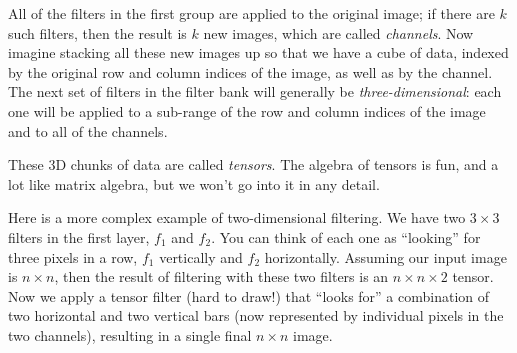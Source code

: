 All of the filters in the first group are applied to the original
image;  if there are $k$ such filters, then the result is $k$ new
images,   which are called {\em channels}.  Now imagine stacking all
these new images up so that we have a cube of data, indexed by the
original row and column indices  of the image,  as well as by the
channel.  The next set of filters in the filter bank will generally be
  {\em three-dimensional}:  each one will be applied to a sub-range of the
row and column indices of the image and to all of the channels.

These 3D chunks of data are called {\em tensors}.
The algebra of tensors is fun, and a lot like matrix algebra,  but we
won't go into it in any detail.

Here is a more complex example of two-dimensional filtering.  We have
two $3 \times 3$ filters in the first layer, $f_1$  and $f_2$.  You
can think of each one as ``looking'' for three pixels in a row, $f_1$
vertically and $f_2$ horizontally.  Assuming our input  image is $n
  \times n$, then the result of filtering with these two filters is an $n
  \times n \times 2$ tensor.  Now we apply a tensor filter (hard to
draw!) that ``looks for'' a combination of two horizontal and two vertical
bars  (now represented by individual pixels in the two channels),
resulting in a single final $n \times  n$ image.

